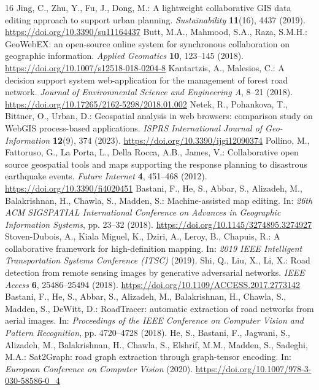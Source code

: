 \documentclass[10pt,a4paper,twocolumn]{article}
\begin{document}
\begin{thebibliography}{16}
 Jing, C., Zhu, Y., Fu, J., Dong, M.: A lightweight collaborative GIS data editing approach to support urban planning. \emph{Sustainability} \textbf{11}(16), 4437 (2019). \url{https://doi.org/10.3390/su11164437}
 Butt, M.A., Mahmood, S.A., Raza, S.M.H.: GeoWebEX: an open-source online system for synchronous collaboration on geographic information. \emph{Applied Geomatics} \textbf{10}, 123--145 (2018). \url{https://doi.org/10.1007/s12518-018-0204-8}
 Kantartzis, A., Malesios, C.: A decision support system web-application for the management of forest road network. \emph{Journal of Environmental Science and Engineering A}, 8--21 (2018). \url{https://doi.org/10.17265/2162-5298/2018.01.002}
 Netek, R., Pohankova, T., Bittner, O., Urban, D.: Geospatial analysis in web browsers: comparison study on WebGIS process-based applications. \emph{ISPRS International Journal of Geo-Information} \textbf{12}(9), 374 (2023). \url{https://doi.org/10.3390/ijgi12090374}
 Pollino, M., Fattoruso, G., La Porta, L., Della Rocca, A.B., James, V.: Collaborative open source geospatial tools and maps supporting the response planning to disastrous earthquake events. \emph{Future Internet} \textbf{4}, 451--468 (2012). \url{https://doi.org/10.3390/fi4020451}
 Bastani, F., He, S., Abbar, S., Alizadeh, M., Balakrishnan, H., Chawla, S., Madden, S.: Machine-assisted map editing. In: \emph{26th ACM SIGSPATIAL International Conference on Advances in Geographic Information Systems}, pp. 23--32 (2018). \url{https://doi.org/10.1145/3274895.3274927}
 Stoven-Dubois, A., Kiala Miguel, K., Dziri, A., Leroy, B., Chapuis, R.: A collaborative framework for high-definition mapping. In: \emph{2019 IEEE Intelligent Transportation Systems Conference (ITSC)} (2019).
 Shi, Q., Liu, X., Li, X.: Road detection from remote sensing images by generative adversarial networks. \emph{IEEE Access} \textbf{6}, 25486--25494 (2018). \url{https://doi.org/10.1109/ACCESS.2017.2773142}
 Bastani, F., He, S., Abbar, S., Alizadeh, M., Balakrishnan, H., Chawla, S., Madden, S., DeWitt, D.: RoadTracer: automatic extraction of road networks from aerial images. In: \emph{Proceedings of the IEEE Conference on Computer Vision and Pattern Recognition}, pp. 4720--4728 (2018).
 He, S., Bastani, F., Jagwani, S., Alizadeh, M., Balakrishnan, H., Chawla, S., Elshrif, M.M., Madden, S., Sadeghi, M.A.: Sat2Graph: road graph extraction through graph-tensor encoding. In: \emph{European Conference on Computer Vision} (2020). \url{https://doi.org/10.1007/978-3-030-58586-0_4}

\end{thebibliography}
\end{document}
